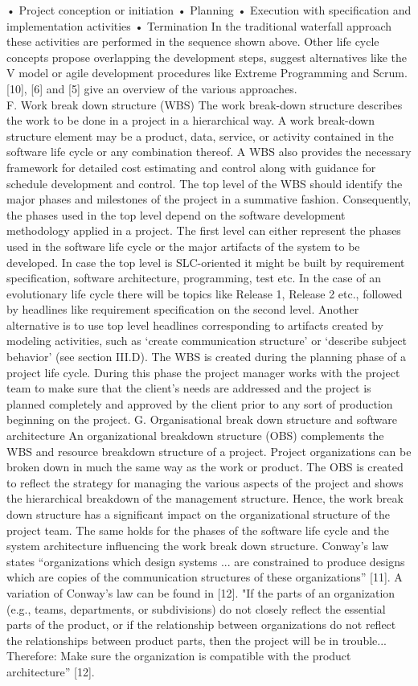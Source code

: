 •	Project conception or initiation
•	Planning
•	Execution with specification and implementation activities
•	Termination
In the traditional waterfall approach these activities are performed in the sequence shown above. Other life cycle concepts propose overlapping the development steps, suggest alternatives like the V model or agile development procedures like Extreme Programming and Scrum. [10], [6] and [5] give an overview of the various approaches.
\\
F.	Work break down structure (WBS)
The work break-down structure describes the work to be done in a project in a hierarchical way. A work break-down structure element may be a product, data, service, or activity contained in the software life cycle or any combination thereof. A WBS also provides the necessary framework for detailed cost estimating and control along with guidance for schedule development and control. The top level of the WBS should identify the major phases and milestones of the project in a summative fashion. Consequently, the phases used in the top level depend on the software development methodology applied in a project. The first level can either represent the phases used in the software life cycle or the major artifacts of the system to be developed. In case the top level is SLC-oriented it might be built by requirement specification, software architecture, programming, test etc. In the case of an evolutionary life cycle there will be topics like Release 1, Release 2 etc., followed by headlines like requirement specification on the second level.
Another alternative is to use top level headlines corresponding to artifacts created by modeling activities, such as ‘create communication structure’ or ‘describe subject behavior’ (see section III.D).
The WBS is created during the planning phase of a project life cycle. During this phase the project manager works with the project team to make sure that the client's needs are addressed and the project is planned completely and approved by the client prior to any sort of production beginning on the project.
G.	Organisational break down structure and software architecture
An organizational breakdown structure (OBS) complements the WBS and resource breakdown structure of a project. Project organizations can be broken down in much the same way as the work or product. The OBS is created to reflect the strategy for managing the various aspects of the project and shows the hierarchical breakdown of the management structure. Hence, the work break down structure has a significant impact on the organizational structure of the project team. The same holds for the phases of the software life cycle and the system architecture influencing the work break down structure. Conway’s law states “organizations which design systems ... are constrained to produce designs which are copies of the communication structures of these organizations” [11]. A variation of Conway’s law can be found in [12]. "If the parts of an organization (e.g., teams, departments, or subdivisions) do not closely reflect the essential parts of the product, or if the relationship between organizations do not reflect the relationships between product parts, then the project will be in trouble... Therefore: Make sure the organization is compatible with the product architecture” [12].
